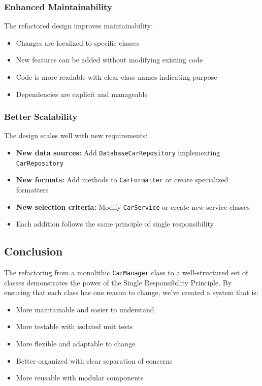 \subsubsection{Enhanced Maintainability}

The refactored design improves maintainability:

\begin{itemize}
    \item Changes are localized to specific classes
    \item New features can be added without modifying existing code
    \item Code is more readable with clear class names indicating purpose
    \item Dependencies are explicit and manageable
\end{itemize}

\subsubsection{Better Scalability}

The design scales well with new requirements:

\begin{itemize}
    \item \textbf{New data sources:} Add \texttt{DatabaseCarRepository} implementing \texttt{CarRepository}
    \item \textbf{New formats:} Add methods to \texttt{CarFormatter} or create specialized formatters
    \item \textbf{New selection criteria:} Modify \texttt{CarService} or create new service classes
    \item Each addition follows the same principle of single responsibility
\end{itemize}

\subsection{Conclusion}

The refactoring from a monolithic \texttt{CarManager} class to a well-structured set of classes demonstrates the power of the Single Responsibility Principle. By ensuring that each class has one reason to change, we've created a system that is:

\begin{itemize}
    \item More maintainable and easier to understand
    \item More testable with isolated unit tests
    \item More flexible and adaptable to change
    \item Better organized with clear separation of concerns
    \item More reusable with modular components
\end{itemize}

